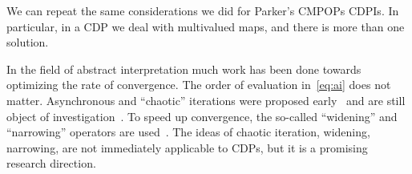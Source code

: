 We can repeat the same considerations we did for Parker's CMPOPs \vs CDPIs.
In particular, in a CDP we deal with multivalued maps, and there is more than one solution.

In the field of abstract interpretation much work has been done towards optimizing the rate of convergence.
The order of evaluation in~\cref{eq:ai} does not matter.
Asynchronous and ``chaotic'' iterations were proposed early~\cite{cousot77asynchronous} and are still object of investigation~\cite{bourdoncleefficient}.
To speed up convergence, the so-called ``widening'' and ``narrowing'' operators are used~\cite{cortesi11widening}.
The ideas of chaotic iteration, widening, narrowing, are not immediately applicable to CDPs, but it is a promising research direction.

